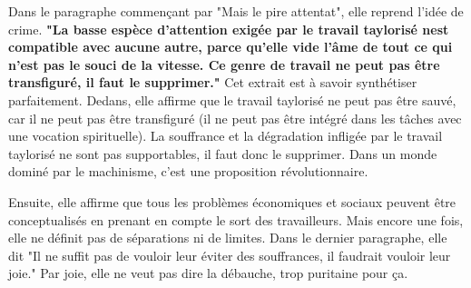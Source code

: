 \documentclass[a4paper,12pt]{book}
\begin{document}
\par Dans le paragraphe commençant par "Mais le pire attentat", elle reprend l'idée de crime. \textbf{"La basse espèce d'attention exigée par le travail taylorisé nest compatible avec aucune autre, parce qu'elle vide l'âme de tout ce qui n'est pas le souci de la vitesse. Ce genre de travail ne peut pas être transfiguré, il faut le supprimer."} Cet extrait est à savoir synthétiser parfaitement. Dedans, elle affirme que le travail taylorisé ne peut pas être sauvé, car il ne peut pas être transfiguré (il ne peut pas être intégré dans les tâches avec une vocation spirituelle). La souffrance et la dégradation infligée par le travail taylorisé ne sont pas supportables, il faut donc le supprimer. Dans un monde dominé par le machinisme, c'est une proposition révolutionnaire.
\par Ensuite, elle affirme que tous les problèmes économiques et sociaux peuvent être conceptualisés en prenant en compte le sort des travailleurs. Mais encore une fois, elle ne définit pas de séparations ni de limites. Dans le dernier paragraphe, elle dit "Il ne suffit pas de vouloir leur éviter des souffrances, il faudrait vouloir leur joie." Par joie, elle ne veut pas dire la débauche, trop puritaine pour ça.
\end{document}
